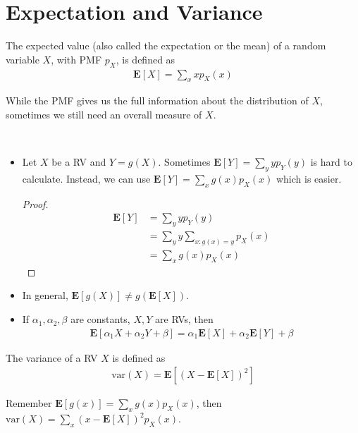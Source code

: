 \section{Expectation and Variance}
\begin{definition}
    The expected value (also called the expectation or the mean) of a random variable $X$, with PMF $p_{X}$, is defined as
    \begin{align}
        \mathbf{E}[X] = \sum_{x} x p_{X}(x)
    \end{align}
\end{definition}
While the PMF gives us the full information about the distribution of $X$, sometimes we still need an overall measure of $X$.
\begin{property} ~ 
    \begin{itemize}
        \item Let $X$ be a RV and $Y = g(X)$. Sometimes $\mathbf{E}[Y] = \sum_{y} y p_{Y}(y)$ is hard to calculate. Instead, we can use $\mathbf{E}[Y] = \sum_{x} g(x) p_{X}(x)$ which is easier.
        \begin{proof}
            \begin{align}
                \mathbf{E}[Y] &= \sum_{y} y p_{Y}(y) \\
                              &= \sum_{y} y \sum_{x: g(x) = y} p_{X}(x) \\
                              &= \sum_{x} g(x) p_{X}(x)
            \end{align}
        \end{proof}
        \item In general, $\mathbf{E}[g(X)] \neq g(\mathbf{E}[X])$.
        \item If $\alpha_1, \alpha_2, \beta$ are constants, $X, Y$ are RVs, then
        \begin{align}
            \mathbf{E}[\alpha_1 X + \alpha_2 Y + \beta] = \alpha_1 \mathbf{E}[X] + \alpha_2 \mathbf{E}[Y] + \beta
        \end{align}
    \end{itemize}
\end{property}
\begin{definition}
    The variance of a RV $X$ is defined as
    \begin{align}
        \mathrm{var}(X) = \mathbf{E}[(X - \mathbf{E}[X])^{2}]
    \end{align}
\end{definition}
Remember $\mathbf{E}[g(x)] = \sum_{x} g(x) p_{X}(x)$, then $\mathrm{var}(X) = \sum_{x} (x - \mathbf{E}[X])^{2} p_{X}(x)$.
